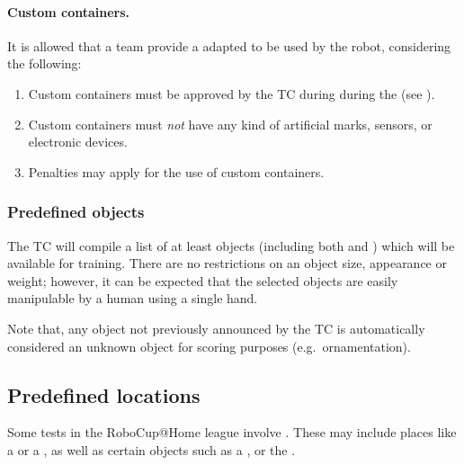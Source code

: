 \paragraph*{Custom containers.} It is allowed that a team provide a  adapted to be used by the robot, considering the following:
\begin{enumerate}
	\item Custom containers must be approved by the TC during during the  (see ).
	\item Custom containers must \emph{not} have any kind of artificial marks, sensors, or electronic devices.
	\item Penalties may apply for the use of custom containers.
\end{enumerate}

\subsubsection{Predefined objects}
The TC will compile a list of at least \NumObjects objects (including both  and ) which will be available for training. There are no restrictions on an object size, appearance or weight; however, it can be expected that the selected objects are easily manipulable by a human using a single hand.

Note that, any object not previously announced by the TC is automatically considered an unknown object for scoring purposes (e.g.~ornamentation).

%
%

\subsection{Predefined locations}
\label{rule:scenario_locations}

Some tests in the RoboCup@Home league involve . 
These may include places like a  or a , as well as certain objects such as a , or the . 

